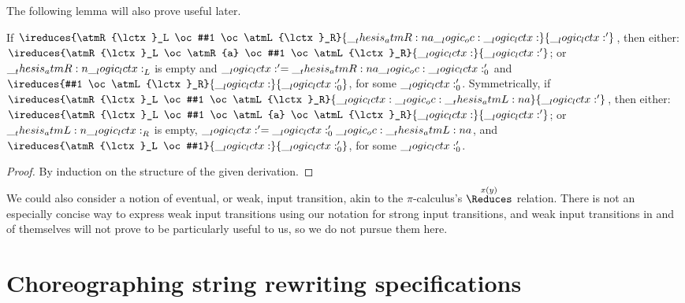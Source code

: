 The following lemma will also prove useful later.
\begin{lemma}\label{lem:choreographies:input-invert}
  If $\ireduces{\atmR{\lctx}_L \oc #1 \oc \atmL{\lctx}_R}{\atmR{a} \oc \lctx}{\lctx'}$, then either: $\ireduces{\atmR{\lctx}_L \oc \atmR{a} \oc #1 \oc \atmL{\lctx}_R}{\lctx}{\lctx'}$; or $\__thesis_atmR:n {\__logic_lctx:}_L$ is empty and $\__logic_lctx:' = \__thesis_atmR:n {a} \__logic_oc: \__logic_lctx:'_0$ and $\ireduces{#1 \oc \atmL{\lctx}_R}{\lctx}{\lctx'_0}$, for some $\__logic_lctx:'_0$.
  Symmetrically, if $\ireduces{\atmR{\lctx}_L \oc #1 \oc \atmL{\lctx}_R}{\lctx \oc \atmL{a}}{\lctx'}$, then either: $\ireduces{\atmR{\lctx}_L \oc #1 \oc \atmL{a} \oc \atmL{\lctx}_R}{\lctx}{\lctx'}$; or $\__thesis_atmL:n {\__logic_lctx:}_R$ is empty, $\__logic_lctx:' = \__logic_lctx:'_0 \__logic_oc: \__thesis_atmL:n {a}$, and $\ireduces{\atmR{\lctx}_L \oc #1}{\lctx}{\lctx'_0}$, for some $\__logic_lctx:'_0$.
\end{lemma}
\begin{proof}
  By induction on the structure of the given derivation.
\end{proof}

We could also consider a notion of eventual, or weak, input transition, akin to the $\pi$-calculus's $\overset{\smash{x(y)}}{\Reduces}$ relation.
There is not an especially concise way to express weak input transitions using our notation for strong input transitions, and weak input transitions in and of themselves will not prove to be particularly useful to us, so we do not pursue them here.


\section{Choreographing string rewriting specifications}\label{sec:formula-as-process:choreographies}\label{sec:choreographies:choreographies}

